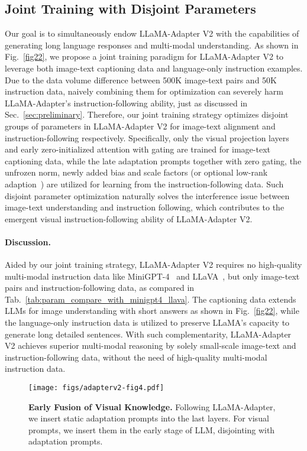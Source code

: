 \documentclass[10pt,twocolumn,letterpaper]{article}
\begin{document}
\subsection{Joint Training with Disjoint Parameters}
\label{subsec:joint}
Our goal is to simultaneously endow LLaMA-Adapter V2 with the capabilities of generating long language responses and multi-modal understanding. As shown in Fig.~\ref{fig22}, we propose a joint training paradigm for LLaMA-Adapter V2 to leverage both image-text captioning data and language-only instruction examples.
Due to the data volume difference between 500K image-text pairs and 50K instruction data, naively combining them for optimization can severely harm LLaMA-Adapter's instruction-following ability, just as discussed in Sec.~\ref{sec:preliminary}. 
Therefore, our joint training strategy optimizes disjoint groups of parameters in LLaMA-Adapter V2 for image-text alignment and instruction-following respectively. 
Specifically, only the visual projection layers and early zero-initialized attention with gating are trained for image-text captioning data, while the late adaptation prompts together with zero gating, the unfrozen norm, newly added bias and scale factors (or optional low-rank adaption~\cite{hu2021lora}) are utilized for learning from the instruction-following data. Such disjoint parameter optimization naturally solves the interference issue between image-text understanding and instruction following, which contributes to the emergent visual instruction-following ability of LLaMA-Adapter V2.


\paragraph{Discussion.}
Aided by our joint training strategy, LLaMA-Adapter V2 requires no high-quality multi-modal instruction data like MiniGPT-4~\cite{zou2022xdecoder} and LLaVA~\cite{liu2023visual}, but only image-text pairs and instruction-following data, as compared in Tab.~\ref{tab:param_compare_with_minigpt4_llava}. The captioning data extends LLMs for image understanding with short answers as shown in Fig.~\ref{fig22}, 
while the language-only instruction data is utilized to preserve LLaMA's capacity to generate long detailed sentences. With such complementarity, LLaMA-Adapter V2 achieves superior multi-modal reasoning by solely small-scale image-text and instruction-following data, without the need of high-quality multi-modal instruction data.

\begin{figure}
    \centering
    \vspace{0.1cm}
    \texttt{[image: figs/adapterv2-fig4.pdf]}
    \caption{\textbf{Early Fusion of Visual Knowledge.} Following LLaMA-Adapter, we insert static adaptation prompts into the last  layers. For visual prompts, we insert them in the early stage of LLM, disjointing with adaptation prompts.}
    \label{fig:early_fusion}
    \vspace{0.2cm}
\end{figure}
\end{document}
